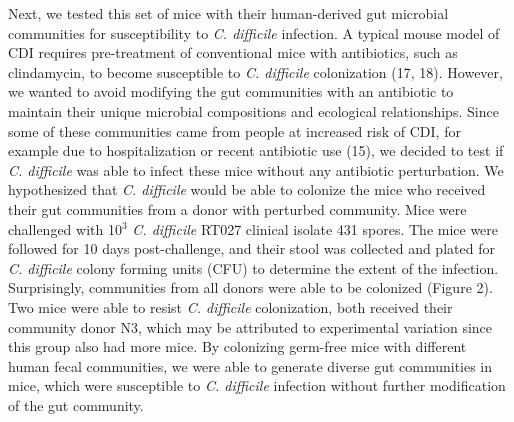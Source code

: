 \documentclass[
  12pt,
]{article}
\begin{document}
Next, we tested this set of mice with their human-derived gut microbial
communities for susceptibility to \emph{C. difficile} infection. A
typical mouse model of CDI requires pre-treatment of conventional mice
with antibiotics, such as clindamycin, to become susceptible to \emph{C.
difficile} colonization (17, 18). However, we wanted to avoid modifying
the gut communities with an antibiotic to maintain their unique
microbial compositions and ecological relationships. Since some of these
communities came from people at increased risk of CDI, for example due
to hospitalization or recent antibiotic use (15), we decided to test if
\emph{C. difficile} was able to infect these mice without any antibiotic
perturbation. We hypothesized that \emph{C. difficile} would be able to
colonize the mice who received their gut communities from a donor with
perturbed community. Mice were challenged with 10\(^{3}\) \emph{C.
difficile} RT027 clinical isolate 431 spores. The mice were followed for
10 days post-challenge, and their stool was collected and plated for
\emph{C. difficile} colony forming units (CFU) to determine the extent
of the infection. Surprisingly, communities from all donors were able to
be colonized (Figure 2). Two mice were able to resist \emph{C.
difficile} colonization, both received their community donor N3, which
may be attributed to experimental variation since this group also had
more mice. By colonizing germ-free mice with different human fecal
communities, we were able to generate diverse gut communities in mice,
which were susceptible to \emph{C. difficile} infection without further
modification of the gut community.
\end{document}
